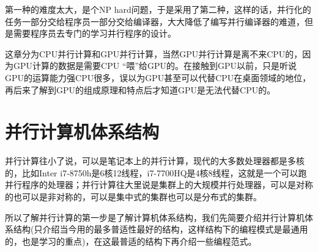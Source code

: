 \documentclass[utf8]{book}
\begin{document}
	第一种的难度太大，是个NP hard问题，于是采用了第二种，这样的话，并行化的任务一部分交给程序员一部分交给编译器，大大降低了编写并行编译器的难道，但是需要程序员去专门的学习并行程序的设计。
	
	这章分为CPU并行计算和GPU并行计算，当然GPU并行计算是离不来CPU的，因为GPU计算的数据是需要CPU “喂”给GPU的。在接触到GPU以前，只是听说GPU的运算能力强CPU很多，误以为GPU甚至可以代替CPU在桌面领域的地位，再后来了解到GPU的组成原理和特点后才知道GPU是无法代替CPU的。
	\section{并行计算机体系结构}
	
	并行计算往小了说，可以是笔记本上的并行计算，现代的大多数处理器都是多核的，比如Inter i7-8750h是6核12线程，i7-7700HQ是4核8线程，这就是一个可以跑并行程序的处理器；并行计算往大里说是集群上的大规模并行处理器，可以是对称的也可以是非对称的，可以是集中式的集群也可以是分布式的集群。
	
	所以了解并行计算的第一步是了解计算机体系结构，我们先简要介绍并行计算机体系结构(只介绍当今用的最多普适性最好的结构，这样结构下的编程模式是最通用的，也是学习的重点)，在这最普适的结构下再介绍一些编程范式。
	
\end{document}
